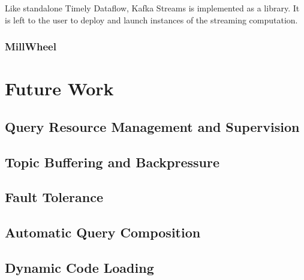 Like standalone Timely Dataflow, Kafka Streams is implemented as a library. It
is left to the user to deploy and launch instances of the streaming computation.

\subsubsection{MillWheel}

\section{Future Work}

\subsection{Query Resource Management and Supervision}

\subsection{Topic Buffering and Backpressure}

\subsection{Fault Tolerance}

\subsection{Automatic Query Composition}

\subsection{Dynamic Code Loading}
